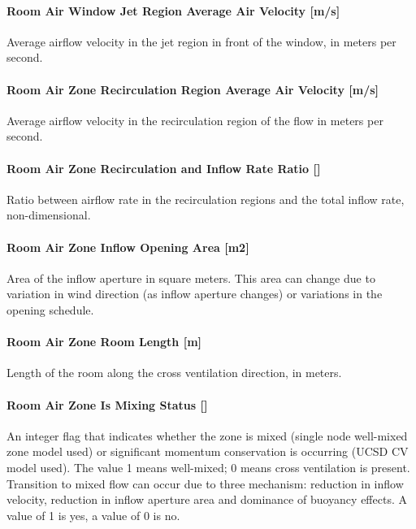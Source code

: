 \paragraph{Room Air Window Jet Region Average Air Velocity {[}m/s{]}}\label{room-air-window-jet-region-average-air-velocity-ms}

Average airflow velocity in the jet region in front of the window, in meters per second.

\paragraph{Room Air Zone Recirculation Region Average Air Velocity {[}m/s{]}}\label{room-air-zone-recirculation-region-average-air-velocity-ms}

Average airflow velocity in the recirculation region of the flow in meters per second.

\paragraph{Room Air Zone Recirculation and Inflow Rate Ratio {[]}}\label{room-air-zone-recirculation-and-inflow-rate-ratio}

Ratio between airflow rate in the recirculation regions and the total inflow rate, non-dimensional.

\paragraph{Room Air Zone Inflow Opening Area {[}m2{]}}\label{room-air-zone-inflow-opening-area-m2}

Area of the inflow aperture in square meters. This area can change due to variation in wind direction (as inflow aperture changes) or variations in the opening schedule.

\paragraph{Room Air Zone Room Length {[}m{]}}\label{room-air-zone-room-length-m}

Length of the room along the cross ventilation direction, in meters.

\paragraph{Room Air Zone Is Mixing Status {[]}}\label{room-air-zone-is-mixing-status}

An integer flag that indicates whether the zone is mixed (single node well-mixed zone model used) or significant momentum conservation is occurring (UCSD CV model used). The value 1 means well-mixed; 0 means cross ventilation is present. Transition to mixed flow can occur due to three mechanism: reduction in inflow velocity, reduction in inflow aperture area and dominance of buoyancy effects. A value of 1 is yes, a value of 0 is no.

